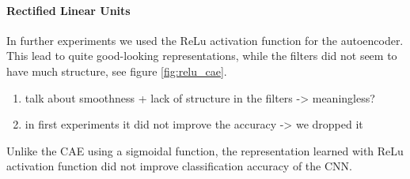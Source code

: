 \documentclass{article}
\begin{document}
    \paragraph{Rectified Linear Units}
      In further experiments we used the ReLu activation function \citep{nair2010rectified} for the autoencoder.
      This lead to quite good-looking representations, while the filters did not seem to have much structure, see figure \ref{fig:relu_cae}.
      
      \begin{enumerate}
        \item talk about smoothness + lack of structure in the filters -> meaningless?
        \item in first experiments it did not improve the accuracy -> we dropped it
      \end{enumerate}

      Unlike the CAE using a sigmoidal function, the representation learned with ReLu activation function did not improve classification accuracy of the CNN.
\end{document}
